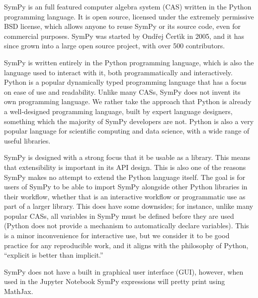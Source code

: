 SymPy is an full featured computer algebra system (CAS) written in the Python
programming language. It is open source, licensed under the extremely
permissive BSD license, which allows anyone to reuse SymPy or its source code,
even for commercial purposes. SymPy was started by Ond\v{r}ej \v{C}ert\'{\i}k
in 2005, and it has since grown into a large open source project, with over
500 contributors.

SymPy is written entirely in the Python programming language,
which is also the language used to interact with it, both programmatically and
interactively. Python is a popular dynamically typed programming language that
has a focus on ease of use and readability. Unlike many CASs, SymPy does not
invent its own programming language. We rather take the approach that Python
is already a well-designed programming language, built by expert language
designers, something which the majority of SymPy developers are not. Python is
also a very popular language for scientific computing and data science, with a
wide range of useful libraries.

SymPy is designed with a strong focus that it be usable as a library. This
means that extensibility is important in its API design. This is also one of
the reasons SymPy makes no attempt to extend the Python language itself. The
goal is for users of SymPy to be able to import SymPy alongside other Python
libraries in their workflow, whether that is an interactive workflow or
programmatic use as part of a larger library. This does have some downsides;
for instance, unlike many popular CASs, all variables in SymPy must be defined
before they are used (Python does not provide a mechanism to automatically
declare variables). This is a minor inconvenience for interactive use, but we
consider it to be good practice for any reproducible work, and it aligns with
the philosophy of Python, ``explicit is better than implicit.''

SymPy does not have a built in graphical user interface (GUI), however, when
used in the Jupyter Notebook
SymPy expressions will pretty print using MathJax.
